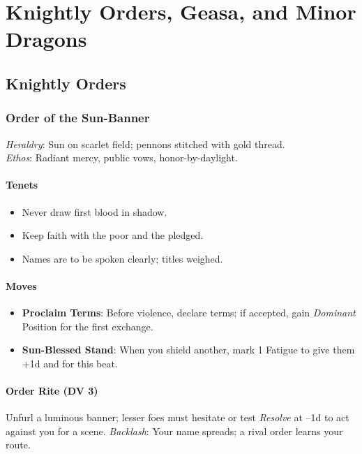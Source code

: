 \documentclass[11pt,letterpaper]{article}
\begin{document}
\section{Knightly Orders, Geasa, and Minor Dragons}


\subsection{Knightly Orders}

\subsubsection{Order of the Sun-Banner}
\textit{Heraldry}: Sun on scarlet field; pennons stitched with gold thread.\\
\textit{Ethos}: Radiant mercy, public vows, honor-by-daylight.

\paragraph{Tenets}
\begin{itemize}[leftmargin=*]
\item Never draw first blood in shadow.
\item Keep faith with the poor and the pledged.
\item Names are to be spoken clearly; titles weighed.
\end{itemize}

\paragraph{Moves}
\begin{itemize}[leftmargin=*]
\item \textbf{Proclaim Terms}: Before violence, declare terms; if accepted, gain \textit{Dominant} Position for the first exchange.
\item \textbf{Sun-Blessed Stand}: When you shield another, mark 1 Fatigue to give them +1d and  for this beat.
\end{itemize}

\paragraph{Order Rite (DV 3)}  
Unfurl a luminous banner; lesser foes must hesitate or test \textit{Resolve} at --1d to act against you for a scene. \textit{Backlash}: Your name spreads; a rival order learns your route.
\end{document}
